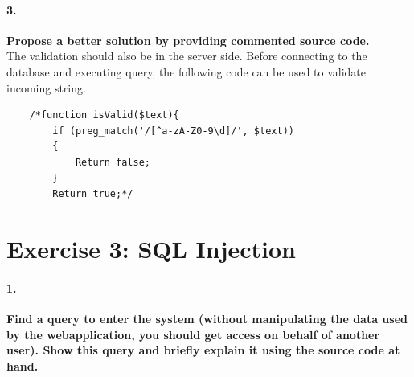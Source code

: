 \documentclass[12pt]{report}
\begin{document}
	\paragraph*{3.} {\bf Propose a better solution by providing commented source code.}\\
		The validation should also be in the server side. Before connecting to the database and executing query, the following code can be used to validate incoming string.
	
	\begin{lstlisting}
	/*function isValid($text){
		if (preg_match('/[^a-zA-Z0-9\d]/', $text))
		{
			Return false;	
		}
		Return true;*/
	\end{lstlisting}
	
	\newpage
	
	\section*{Exercise 3: SQL Injection}
	
	\paragraph*{1.} {\bf Find a query to enter the system (without manipulating the data used by the webapplication, you should get access on behalf of another user). Show this query and briefly explain it using the source code at hand.}\\
	
\end{document}

